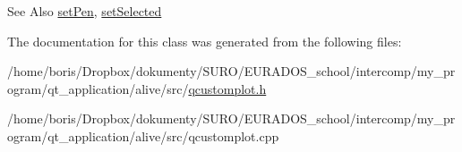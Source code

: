 \begin{DoxySeeAlso}{See Also}
\hyperlink{classQCPItemPixmap_acdade1305edb4b5cae14f97fd132065f}{set\-Pen}, \hyperlink{classQCPAbstractItem_a203de94ad586cc44d16c9565f49d3378}{set\-Selected} 
\end{DoxySeeAlso}


The documentation for this class was generated from the following files\-:\begin{DoxyCompactItemize}
\item 
/home/boris/\-Dropbox/dokumenty/\-S\-U\-R\-O/\-E\-U\-R\-A\-D\-O\-S\-\_\-school/intercomp/my\-\_\-program/qt\-\_\-application/alive/src/\hyperlink{qcustomplot_8h}{qcustomplot.\-h}\item 
/home/boris/\-Dropbox/dokumenty/\-S\-U\-R\-O/\-E\-U\-R\-A\-D\-O\-S\-\_\-school/intercomp/my\-\_\-program/qt\-\_\-application/alive/src/qcustomplot.\-cpp\end{DoxyCompactItemize}
